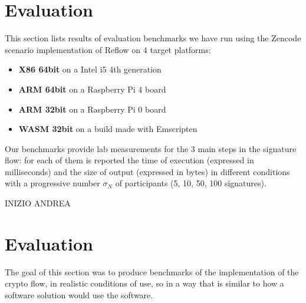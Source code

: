 \documentclass[twocolumn]{article}
\begin{document}
\pagebreak

\section{Evaluation}
\label{sec:evaluation}

This section lists results of evaluation benchmarks we have run using the Zencode scenario implementation of Reflow on 4 target platforms:
\begin{itemize}
  \item \textbf{X86 64bit} on a Intel i5 4th generation
  \item \textbf{ARM 64bit} on a Raspberry Pi 4 board
  \item \textbf{ARM 32bit} on a Raspberry Pi 0 board
  \item \textbf{WASM 32bit} on a build made with Emscripten
\end{itemize}

Our benchmarks provide lab measurements for the 3 main steps in the signature flow: for each of them is reported the time of execution (expressed in milliseconds) and the size of output (expressed in bytes) in different conditions with a progressive number $\sigma_N$ of participants (5, 10, 50, 100 signatures).




INIZIO ANDREA

\section{Evaluation}
\label{sec:evaluation}



The goal of this section was to produce benchmarks of the implementation of the crypto flow, in  realistic conditions of use, so in a way that is similar to how a software solution would use the software. 
\end{document}
